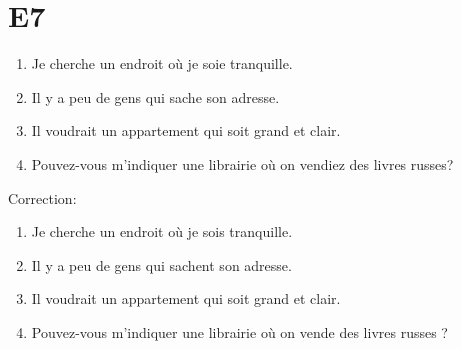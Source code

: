 \documentclass{book}
\begin{document}
    \section{E7}
        \begin{enumerate}
            \item Je cherche un endroit où je soie tranquille.
            \item Il y a peu de gens qui sache son adresse.
            \item Il voudrait un appartement qui soit grand et clair.
            \item Pouvez-vous m'indiquer une librairie où on vendiez des livres russes?
        \end{enumerate}
        Correction:
        \begin{enumerate}
            \item Je cherche un endroit où je sois tranquille.
            \item Il y a peu de gens qui sachent son adresse.
            \item Il voudrait un appartement qui soit grand et clair.
            \item Pouvez-vous m'indiquer une librairie où on vende des livres russes ?
        \end{enumerate}
\end{document}

